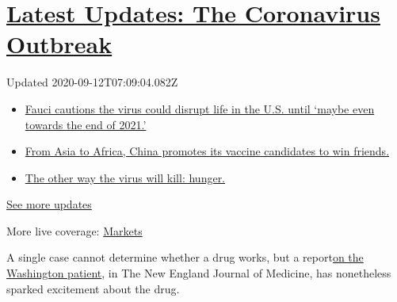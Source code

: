 \hypertarget{latest-updates-the-coronavirus-outbreak}{%
\section{\texorpdfstring{\href{https://www.nytimes3xbfgragh.onion/2020/09/11/world/covid-19-coronavirus.html?action=click\&pgtype=Article\&state=default\&region=MAIN_CONTENT_1\&context=storylines_live_updates}{Latest
Updates: The Coronavirus
Outbreak}}{Latest Updates: The Coronavirus Outbreak}}\label{latest-updates-the-coronavirus-outbreak}}

Updated 2020-09-12T07:09:04.082Z

\begin{itemize}
\tightlist
\item
  \href{https://www.nytimes3xbfgragh.onion/2020/09/11/world/covid-19-coronavirus.html?action=click\&pgtype=Article\&state=default\&region=MAIN_CONTENT_1\&context=storylines_live_updates\#link-dfb8a16}{Fauci
  cautions the virus could disrupt life in the U.S. until `maybe even
  towards the end of 2021.'}
\item
  \href{https://www.nytimes3xbfgragh.onion/2020/09/11/world/covid-19-coronavirus.html?action=click\&pgtype=Article\&state=default\&region=MAIN_CONTENT_1\&context=storylines_live_updates\#link-7104d154}{From
  Asia to Africa, China promotes its vaccine candidates to win friends.}
\item
  \href{https://www.nytimes3xbfgragh.onion/2020/09/11/world/covid-19-coronavirus.html?action=click\&pgtype=Article\&state=default\&region=MAIN_CONTENT_1\&context=storylines_live_updates\#link-393ad215}{The
  other way the virus will kill: hunger.}
\end{itemize}

\href{https://www.nytimes3xbfgragh.onion/2020/09/11/world/covid-19-coronavirus.html?action=click\&pgtype=Article\&state=default\&region=MAIN_CONTENT_1\&context=storylines_live_updates}{See
more updates}

More live coverage:
\href{https://www.nytimes3xbfgragh.onion/live/2020/09/11/business/stock-market-today-coronavirus?action=click\&pgtype=Article\&state=default\&region=MAIN_CONTENT_1\&context=storylines_live_updates}{Markets}

A single case cannot determine whether a drug works, but a
report\href{https://www.nejm.org/doi/full/10.1056/NEJMoa2001191}{on the
Washington patient}, in The New England Journal of Medicine, has
nonetheless sparked excitement about the drug.


